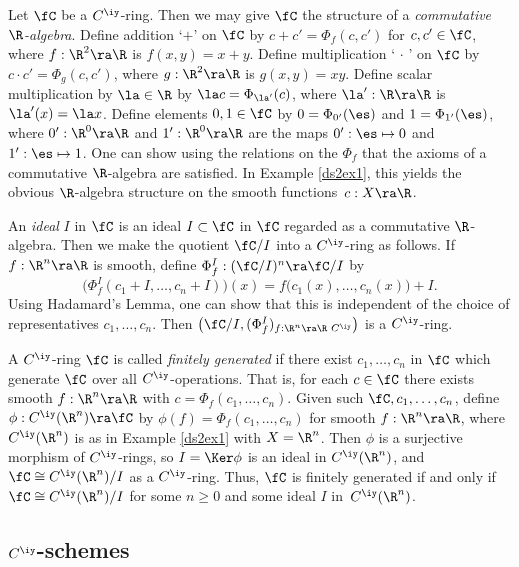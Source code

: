 \documentclass{article}
\begin{document}
\begin{dfn} Let $\fC$ be a $C^\iy$-ring. Then we may give $\fC$ the
structure of a {\it commutative\/ $\R$-algebra}. Define addition
`$+$' on $\fC$ by $c+c'=\Phi_f(c,c')$ for $c,c'\in\fC$, where
$f:\R^2\ra\R$ is $f(x,y)=x+y$. Define multiplication `$\,\cdot\,$'
on $\fC$ by $c\cdot c'=\Phi_g(c,c')$, where $g:\R^2\ra\R$ is
$g(x,y)=xy$. Define scalar multiplication by $\la\in\R$ by $\la
c=\Phi_{\la'}(c)$, where $\la':\R\ra\R$ is $\la'(x)=\la x$. Define
elements $0,1\in\fC$ by $0=\Phi_{0'}(\es)$ and $1=\Phi_{1'}(\es)$,
where $0':\R^0\ra\R$ and $1':\R^0\ra\R$ are the maps $0':\es\mapsto
0$ and $1':\es\mapsto 1$. One can show using the relations on the
$\Phi_f$ that the axioms of a commutative $\R$-algebra are
satisfied. In Example \ref{ds2ex1}, this yields the obvious
$\R$-algebra structure on the smooth functions~$c:X\ra\R$.

An {\it ideal\/} $I$ in $\fC$ is an ideal $I\subset\fC$ in $\fC$
regarded as a commutative $\R$-algebra. Then we make the quotient
$\fC/I$ into a $C^\iy$-ring as follows. If $f:\R^n\ra\R$ is smooth,
define $\Phi_f^I:(\fC/I)^n\ra\fC/I$ by
\begin{equation*}
\bigl(\Phi_f^I(c_1+I,\ldots,c_n+I)\bigr)(x)=f\bigl(c_1(x),\ldots,
c_n(x)\bigr)+I.
\end{equation*}
Using Hadamard's Lemma, one can show that this
is independent of the choice of representatives $c_1,\ldots,c_n$.
Then $\bigl(\fC/I,(\Phi_f^I)_{ f:\R^n\ra\R\,\,C^\iy}\bigr)$ is a
$C^\iy$-ring.

A $C^\iy$-ring $\fC$ is called {\it finitely
generated\/} if there
exist $c_1,\ldots,c_n$ in $\fC$ which generate $\fC$ over all
$C^\iy$-operations. That is, for each $c\in\fC$ there exists smooth
$f:\R^n\ra\R$ with $c=\Phi_f(c_1,\ldots,c_n)$. Given such
$\fC,c_1,\ldots,c_n$, define $\phi:C^\iy(\R^n)\ra\fC$ by
$\phi(f)=\Phi_f(c_1,\ldots,c_n)$ for smooth $f:\R^n\ra\R$, where
$C^\iy(\R^n)$ is as in Example \ref{ds2ex1} with $X=\R^n$. Then
$\phi$ is a surjective morphism of $C^\iy$-rings, so $I=\Ker\phi$ is
an ideal in $C^\iy(\R^n)$, and $\fC\cong C^\iy(\R^n)/I$ as a
$C^\iy$-ring. Thus, $\fC$ is finitely generated if and only if
$\fC\cong C^\iy(\R^n)/I$ for some $n\ge 0$ and some ideal $I$
in~$C^\iy(\R^n)$.
\label{ds2def2}
\end{dfn}

\subsection{$C^\iy$-schemes}
\label{ds22}
\end{document}
